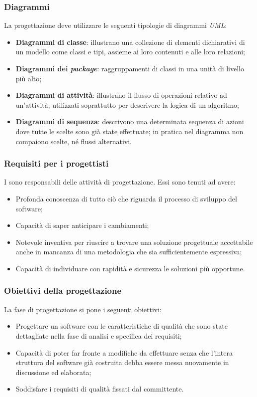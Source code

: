 \subsubsection{Diagrammi}
La progettazione deve utilizzare le seguenti tipologie di diagrammi \textit{UML}:
\begin{itemize}
\item
\textbf{Diagrammi di classe}: illustrano una collezione di elementi dichiarativi di un modello come classi e tipi, assieme ai loro contenuti e alle loro relazioni;
\item
\textbf{Diagrammi dei \textit{package}}: raggruppamenti di classi in una unità di livello più alto;
\item
\textbf{Diagrammi di attività}: illustrano il flusso di operazioni relativo ad un'attività; utilizzati soprattutto per descrivere la logica di un algoritmo;
\item
\textbf{Diagrammi di sequenza}: descrivono una determinata sequenza di azioni dove tutte le scelte sono già state effettuate; in pratica nel diagramma non compaiono scelte, né flussi alternativi.
\end{itemize}


\subsubsection{Requisiti per i progettisti}

I \textit{\Progs} sono responsabili delle attività di progettazione. Essi sono tenuti ad avere:
\begin{itemize}
\item
Profonda conoscenza di tutto ciò che riguarda il processo di sviluppo del software;
\item
Capacità di saper anticipare i cambiamenti;
\item
Notevole inventiva per riuscire a trovare una soluzione progettuale accettabile anche in mancanza di una metodologia che sia sufficientemente espressiva;
\item
Capacità di individuare con rapidità e sicurezza le soluzioni più opportune.
\end{itemize}

\subsubsection{Obiettivi della progettazione}
La fase di progettazione si pone i seguenti obiettivi:
\begin{itemize}
\item
Progettare un software con le caratteristiche di qualità che sono state dettagliate nella fase di analisi e specifica dei requisiti;
\item
Capacità di poter far fronte a modifiche da effettuare senza che l'intera struttura del software già costruita debba essere messa nuovamente in discussione ed elaborata;
\item
Soddisfare i requisiti di qualità fissati dal committente.
\end{itemize}

